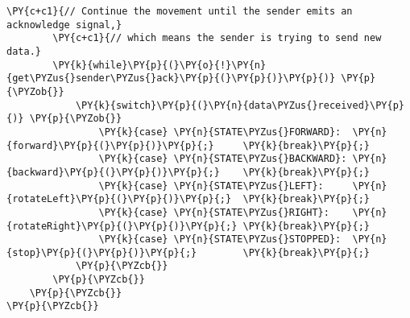 \begin{Verbatim}[commandchars=\\\{\}]
        \PY{c+c1}{// Continue the movement until the sender emits an acknowledge signal,}
        \PY{c+c1}{// which means the sender is trying to send new data.}
        \PY{k}{while}\PY{p}{(}\PY{o}{!}\PY{n}{get\PYZus{}sender\PYZus{}ack}\PY{p}{(}\PY{p}{)}\PY{p}{)} \PY{p}{\PYZob{}}
            \PY{k}{switch}\PY{p}{(}\PY{n}{data\PYZus{}received}\PY{p}{)} \PY{p}{\PYZob{}}
                \PY{k}{case} \PY{n}{STATE\PYZus{}FORWARD}:  \PY{n}{forward}\PY{p}{(}\PY{p}{)}\PY{p}{;}     \PY{k}{break}\PY{p}{;}
                \PY{k}{case} \PY{n}{STATE\PYZus{}BACKWARD}: \PY{n}{backward}\PY{p}{(}\PY{p}{)}\PY{p}{;}    \PY{k}{break}\PY{p}{;}
                \PY{k}{case} \PY{n}{STATE\PYZus{}LEFT}:     \PY{n}{rotateLeft}\PY{p}{(}\PY{p}{)}\PY{p}{;}  \PY{k}{break}\PY{p}{;}
                \PY{k}{case} \PY{n}{STATE\PYZus{}RIGHT}:    \PY{n}{rotateRight}\PY{p}{(}\PY{p}{)}\PY{p}{;} \PY{k}{break}\PY{p}{;}
                \PY{k}{case} \PY{n}{STATE\PYZus{}STOPPED}:  \PY{n}{stop}\PY{p}{(}\PY{p}{)}\PY{p}{;}        \PY{k}{break}\PY{p}{;}
            \PY{p}{\PYZcb{}}
        \PY{p}{\PYZcb{}}
    \PY{p}{\PYZcb{}}
\PY{p}{\PYZcb{}}
\end{Verbatim}
